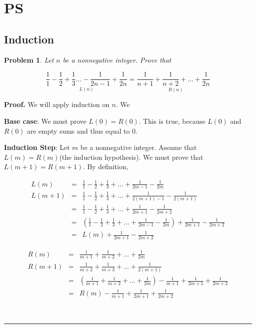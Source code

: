\documentclass{article}
\newtheorem{problem}[theorem]{Problem}
\newenvironment{proof}[1][Proof]{\noindent\textbf{#1.} }{\ \rule{0.5em}{0.5em}}
\begin{document}
\section{PS}

\subsection{\protect\bigskip Induction}

\begin{problem}
Let $n$ be a nonnegative integer. Prove that
\end{problem}

\[
\text{ }\underset{L(n)}{\frac{1}{1}-\frac{1}{2}+\frac{1}{3}...-\frac{1}{2n-1}%
+\frac{1}{2n}}=\underset{R(n)}{\frac{1}{n+1}+\frac{1}{n+2}+...+\frac{1}{2n}%
\text{ }}
\]

\begin{proof}
We will apply induction on $n$. We

\textbf{Base case}: We must prove $L(0)=R(0)$. This is true, because $L(0)$
and $R(0)$ are empty sums and thus equal to $0.$

\textbf{Induction Step}: Let $m$ be a nonnegative integer. Assume that $%
L(m)=R(m)$(the induction hypothesis). We must prove that $L(m+1)=R(m+1)$. By
definition,

\begin{eqnarray*}
L(m) &=&\frac{1}{1}-\frac{1}{2}+\frac{1}{3}+...+\frac{1}{2m-1}-\frac{1}{2m}
\\
L(m+1) &=&\frac{1}{1}-\frac{1}{2}+\frac{1}{3}+...+\frac{1}{2(m+1)-1}-\frac{1%
}{2(m+1)} \\
&=&\frac{1}{1}-\frac{1}{2}+\frac{1}{3}+...+\frac{1}{2m+1}-\frac{1}{2m+2} \\
&=&(\frac{1}{1}-\frac{1}{2}+\frac{1}{3}+...+\frac{1}{2m-1}-\frac{1}{2m})+%
\frac{1}{2m+1}-\frac{1}{2m+2} \\
&=&L(m)+\frac{1}{2m+1}-\frac{1}{2m+2}
\end{eqnarray*}

\begin{eqnarray*}
R(m) &=&\frac{1}{m+1}+\frac{1}{m+2}+...+\frac{1}{2m} \\
R(m+1) &=&\frac{1}{m+2}+\frac{1}{m+3}+...+\frac{1}{2(m+1)} \\
&=&(\frac{1}{m+1}+\frac{1}{m+2}+...+\frac{1}{2m})-\frac{1}{m+1}+\frac{1}{2m+1%
}+\frac{1}{2m+2} \\
&=&R(m)-\frac{1}{m+1}+\frac{1}{2m+1}+\frac{1}{2m+2}
\end{eqnarray*}


\end{proof}
\end{document}
